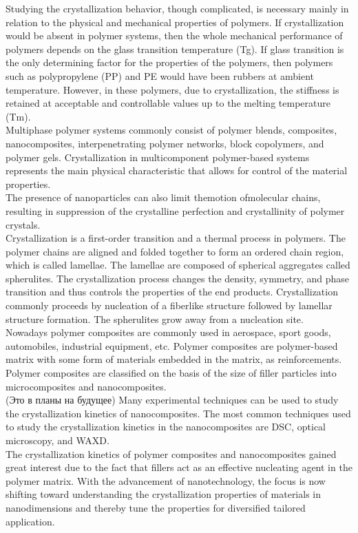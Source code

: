 Studying the crystallization
behavior, though complicated, is necessary mainly in relation to the physical and
mechanical properties of polymers. If crystallization would be absent in polymer
systems, then the whole mechanical performance of polymers depends on the glass
transition temperature (Tg). If glass transition is the only determining factor for the
properties of the polymers, then polymers such as polypropylene (PP) and PE
would have been rubbers at ambient temperature. However, in these polymers,
due to crystallization, the stiffness is retained at acceptable and controllable values
up to the melting temperature (Tm).\\
Multiphase polymer systems commonly consist of polymer blends, composites,
nanocomposites, interpenetrating polymer networks, block copolymers, and polymer
gels. Crystallization in multicomponent polymer-based systems represents the main
physical characteristic that allows for control of the material properties.\\
The presence of nanoparticles
can also limit themotion ofmolecular chains, resulting in suppression of the crystalline
perfection and crystallinity of polymer crystals.\\
Crystallization is a first-order transition and a thermal process in polymers. The
polymer chains are aligned and folded together to form an ordered chain region,
which is called lamellae. The lamellae are composed of spherical aggregates called
spherulites. The crystallization process changes the density, symmetry, and phase
transition and thus controls the properties of the end products. Crystallization
commonly proceeds by nucleation of a fiberlike structure followed by lamellar
structure formation. The spherulites grow away from a nucleation site.\\
Nowadays polymer composites are commonly used in aerospace, sport goods, automobiles,
industrial equipment, etc. Polymer composites are polymer-based matrix
with some form of materials embedded in the matrix, as reinforcements.\\
Polymer composites are classified on the basis of the size of filler particles into
microcomposites and nanocomposites.\\
(Это в планы на будущее)
Many experimental techniques can be used to study the crystallization
kinetics of nanocomposites. The most common techniques used to study the
crystallization kinetics in the nanocomposites are DSC, optical microscopy, and
WAXD.\\
The crystallization
kinetics of polymer composites and nanocomposites gained great interest due to the
fact that fillers act as an effective nucleating agent in the polymer matrix. With the
advancement of nanotechnology, the focus is now shifting toward understanding
the crystallization properties of materials in nanodimensions and thereby tune the
properties for diversified tailored application.\\

